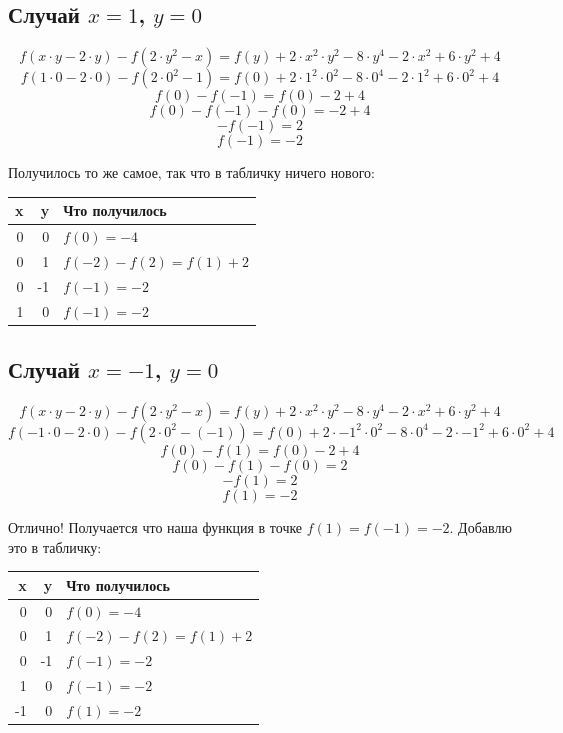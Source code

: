 \documentclass{article}
\begin{document}
\subsection{Случай $x=1$, $y=0$}
$$f(x\cdot{}y-2\cdot{}y)-f(2\cdot{}y^2-x)=f(y)+2\cdot{}x^2\cdot{}y^2-8\cdot{}y^4-2\cdot{}x^2+6\cdot{}y^2+4$$
$$f(1\cdot{}0-2\cdot{}0)-f(2\cdot{}0^2-1)=f(0)+2\cdot{}1^2\cdot{}0^2-8\cdot{}0^4-2\cdot{}1^2+6\cdot{}0^2+4$$
$$f(0)-f(-1)=f(0)-2+4$$
$$f(0)-f(-1)-f(0)=-2+4$$
$$-f(-1)=2$$
$$f(-1)=-2$$
\begin{samepage}
Получилось то же самое, так что в табличку ничего нового:
\begin{center}
 \begin{tabular}{r r l}
 \hline
 x & y & Что получилось       \\
 \hline
 0 &  0 & $f(0)=-4$           \\
 0 &  1 & $f(-2)-f(2)=f(1)+2$ \\
 0 & -1 & $f(-1)=-2$          \\
 1 &  0 & $f(-1)=-2$ \\
 \hline
 \end{tabular}
\end{center}
\end{samepage}

\subsection{Случай $x=-1$, $y=0$}
$$f(x\cdot{}y-2\cdot{}y)-f(2\cdot{}y^2-x)=f(y)+2\cdot{}x^2\cdot{}y^2-8\cdot{}y^4-2\cdot{}x^2+6\cdot{}y^2+4$$
$$f(-1\cdot{}0-2\cdot{}0)-f(2\cdot{}0^2-(-1))=f(0)+2\cdot{}{-1}^2\cdot{}0^2-8\cdot{}{0}^4-2\cdot{}{-1}^2+6\cdot{}0^2+4$$
$$f(0)-f(1)=f(0)-2+4$$
$$f(0)-f(1)-f(0)=2$$
$$-f(1)=2$$
$$f(1)=-2$$

Отлично! Получается что наша функция в точке {\boldmath\color{red} $f(1)=f(-1)=-2$}. Добавлю это в табличку:

\begin{samepage}
\begin{center}
 \begin{tabular}{r r l}
 \hline
 x & y & Что получилось        \\
 \hline
  0 &  0 & $f(0)=-4$           \\
  0 &  1 & $f(-2)-f(2)=f(1)+2$ \\
  0 & -1 & $f(-1)=-2$          \\
  1 &  0 & $f(-1)=-2$          \\
 -1 &  0 & $f(1)=-2$ \\
 \hline
 \end{tabular}
\end{center}
\end{samepage}
\end{document}
